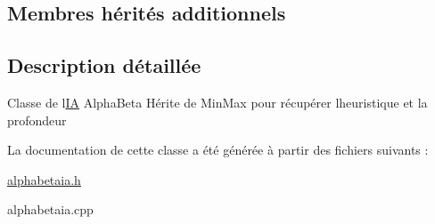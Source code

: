 \subsection*{Membres hérités additionnels}


\subsection{Description détaillée}
Classe de l\textquotesingle{}\hyperlink{classIA}{IA} Alpha\+Beta Hérite de Min\+Max pour récupérer l\textquotesingle{}heuristique et la profondeur 

La documentation de cette classe a été générée à partir des fichiers suivants \+:\begin{DoxyCompactItemize}
\item 
\hyperlink{alphabetaia_8h}{alphabetaia.\+h}\item 
alphabetaia.\+cpp\end{DoxyCompactItemize}

